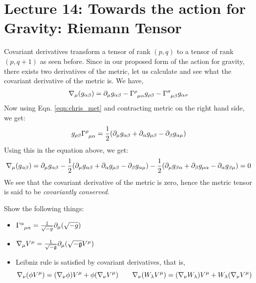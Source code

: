 \section*{Lecture 14: Towards the action for Gravity: Riemann Tensor}\label{lec:14}
Covariant derivatives transform a tensor of rank $(p,q)$ to a tensor of rank $(p,q+1)$ as seen before. Since in our proposed form of the action for gravity, there exists two derivatives of the metric, let us calculate and see what the covariant derivative of the metric is. We have,
\begin{align*}
    \covd{\mu}(g_{\alpha\beta}) = \partial_\mu g_{\ga\gb} - \chris{\gr}{\gm}{\ga}g_{\gr\gb} - \chris{\gs}{\gm}{\gb}g_{\ga\gs}
\end{align*}
Now using Eqn. \ref{eqn:chris_met} and contracting metric on the right hand side, we get:
\begin{align*}
    g_{\gr\gb}\chris{\gr}{\gm}{\ga} = \frac{1}{2}\qty(\partial_\mu g_{\ga\gb} +\partial_\ga g_{\mu\gb} - \partial_\gb g_{\ga\mu}  )
\end{align*}
Using this in the equation above, we get:
\begin{align*}
    \nabla_{\mu}(g_{\alpha\beta}) =  \partial_\mu g_{\alpha\beta} -\frac{1}{2}\qty(\partial_\mu g_{\alpha\beta} +\partial_\alpha g_{\mu\beta} - \partial_\beta g_{\alpha\mu}  ) - \frac{1}{2}\qty(\partial_\mu g_{\beta\alpha} +\partial_\beta g_{\mu\alpha} - \partial_\alpha g_{\beta\mu}  )=0
\end{align*}
We see that the covariant derivative of the metric is zero, hence the metric tensor is said to be \textit{covariantly conserved}.\\[0.2cm]


\begin{tcolorbox}[colframe=black, colback=lime!20!white, boxrule=1.5pt, arc=4pt]
Show the following things:
\begin{itemize} 
    \item $\chris{\alpha}{\mu}{\alpha} = \frac{1}{\sqrt{-g}}\partial_\mu (\sqrt{-g})$
    \item $\nabla_{\mu}V^\mu = \frac{1}{\sqrt{-\mathfrak{g}}}\partial_\mu(\sqrt{-\mathfrak{g}} V^\mu)$
    \item Leibniz rule is satisfied by covariant derivatives, that is, 
    $$\nabla_{\nu}(\phi V^\mu) = (\nabla_{\nu}\phi)V^\mu+\phi(\nabla_{\nu}V^\mu) \qquad \nabla_{\nu}(W_\lambda V^\mu) = (\nabla_{\nu}W_\lambda)V^\mu+W_\lambda(\nabla_{\nu}V^\mu)$$
\end{itemize}
\end{tcolorbox}
\noindent

